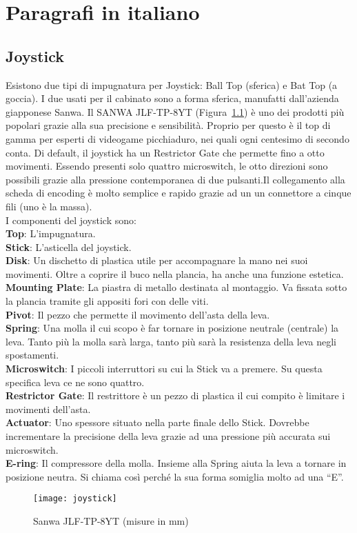 \appendix
\renewcommand{\thechapter}{}
\chapter{Paragrafi in italiano}
\renewcommand{\thechapter}{\Alph{chapter}}
\section{Joystick}
 Esistono due tipi di impugnatura per Joystick: Ball Top (sferica) e Bat Top (a goccia). I due usati per il cabinato sono a forma sferica, manufatti dall’azienda giapponese Sanwa. Il SANWA JLF-TP-8YT (Figura~\ref{fig:sanwaita}) è uno dei prodotti più popolari grazie alla sua precisione e sensibilità. Proprio per questo è il top di gamma per esperti di videogame picchiaduro, nei quali ogni centesimo di secondo conta. Di default, il joystick ha un Restrictor Gate che permette fino a otto movimenti. Essendo presenti solo quattro microswitch, le otto direzioni sono possibili grazie alla pressione contemporanea di due pulsanti.Il collegamento alla scheda di encoding è molto semplice e rapido grazie ad un un connettore a cinque fili (uno è la massa).\\
I componenti del joystick sono:\\
\textbf{Top}: L’impugnatura.\\
\textbf{Stick}: L’asticella del joystick.\\
\textbf{Disk}: Un dischetto di plastica utile per accompagnare la mano nei suoi movimenti. Oltre a coprire il buco nella plancia, ha anche una funzione estetica.\\
\textbf{Mounting Plate}: La piastra di metallo destinata al montaggio. Va fissata sotto la plancia tramite gli appositi fori con delle viti.\\
\textbf{Pivot}: Il pezzo che permette il movimento dell'asta della leva.\\  
\textbf{Spring}: Una molla il cui scopo è far tornare in posizione neutrale (centrale) la leva. Tanto più la molla sarà larga, tanto più sarà la resistenza della leva negli spostamenti.\\
\textbf{Microswitch}: I piccoli interruttori su cui la Stick va a premere. Su questa specifica leva ce ne sono quattro.\\
\textbf{Restrictor Gate}: Il restrittore è un pezzo di plastica il cui compito è limitare i movimenti dell'asta.\\
\textbf{Actuator}: Uno spessore situato nella parte finale dello Stick. Dovrebbe incrementare la precisione della leva grazie ad una pressione più accurata sui microswitch.\\
\textbf{E-ring}: Il compressore della molla. Insieme alla Spring aiuta la leva a tornare in posizione neutra. Si chiama così perché la sua forma somiglia molto ad una “E”.\\
\begin{figure}[h!]
\texttt{[image: joystick]}
\centering
\caption{Sanwa JLF-TP-8YT (misure in mm)}
\label{fig:sanwaita}
\end{figure}